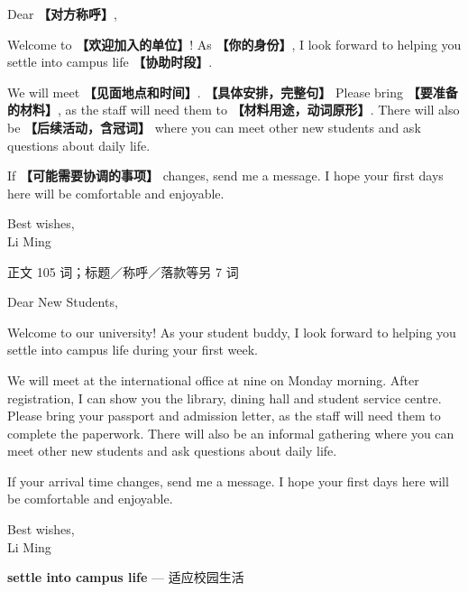\documentclass[11pt,a4paper,fontset=macnew]{ctexart}
\newenvironment{writing}{\begingroup\fontsize{10.5}{13.5}\selectfont\setlength{\parskip}{3pt}}{\par\endgroup}
\newenvironment{example}{\begingroup\fontsize{11}{14.3}\selectfont\setlength{\parskip}{4pt}}{\par\endgroup}
\begin{document}
\begin{writing}
\noindent Dear {\bfseries 【对方称呼】},\par
Welcome to {\bfseries 【欢迎加入的单位】}! As {\bfseries 【你的身份】}, I look forward to helping you settle into campus life {\bfseries 【协助时段】}.

We will meet {\bfseries 【见面地点和时间】}. {\bfseries 【具体安排，完整句】} Please bring {\bfseries 【要准备的材料】}, as the staff will need them to {\bfseries 【材料用途，动词原形】}. There will also be {\bfseries 【后续活动，含冠词】} where you can meet other new students and ask questions about daily life.

If {\bfseries 【可能需要协调的事项】} changes, send me a message. I hope your first days here will be comfortable and enjoyable.

\noindent Best wishes,\\Li Ming\par
\end{writing}
\par\vspace{4pt}{\bfseries 完整套用示例}\par\nopagebreak
{\small 正文 105 词；标题／称呼／落款等另 7 词}\par
\begin{example}
\noindent Dear New Students,\par
Welcome to our university! As your student buddy, I look forward to helping you settle into campus life during your first week.

We will meet at the international office at nine on Monday morning. After registration, I can show you the library, dining hall and student service centre. Please bring your passport and admission letter, as the staff will need them to complete the paperwork. There will also be an informal gathering where you can meet other new students and ask questions about daily life.

If your arrival time changes, send me a message. I hope your first days here will be comfortable and enjoyable.

\noindent Best wishes,\\Li Ming\par
\end{example}
\par\vspace{4pt}{\bfseries 好词好句：优先记这三处}\par\nopagebreak
{\small\textbf{settle into campus life} — 适应校园生活}\par
\end{document}
